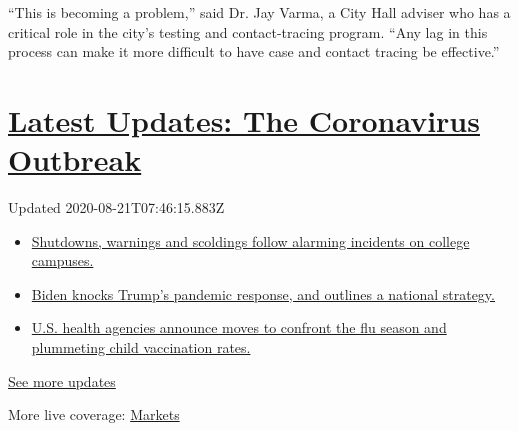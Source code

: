``This is becoming a problem,'' said Dr. Jay Varma, a City Hall adviser
who has a critical role in the city's testing and contact-tracing
program. ``Any lag in this process can make it more difficult to have
case and contact tracing be effective.''

\hypertarget{latest-updates-the-coronavirus-outbreak}{%
\section{\texorpdfstring{\href{https://www.nytimes3xbfgragh.onion/2020/08/20/world/coronavirus-covid.html?action=click\&pgtype=Article\&state=default\&region=MAIN_CONTENT_1\&context=storylines_live_updates}{Latest
Updates: The Coronavirus
Outbreak}}{Latest Updates: The Coronavirus Outbreak}}\label{latest-updates-the-coronavirus-outbreak}}

Updated 2020-08-21T07:46:15.883Z

\begin{itemize}
\tightlist
\item
  \href{https://www.nytimes3xbfgragh.onion/2020/08/20/world/coronavirus-covid.html?action=click\&pgtype=Article\&state=default\&region=MAIN_CONTENT_1\&context=storylines_live_updates\#link-68774d88}{Shutdowns,
  warnings and scoldings follow alarming incidents on college campuses.}
\item
  \href{https://www.nytimes3xbfgragh.onion/2020/08/20/world/coronavirus-covid.html?action=click\&pgtype=Article\&state=default\&region=MAIN_CONTENT_1\&context=storylines_live_updates\#link-26b58724}{Biden
  knocks Trump's pandemic response, and outlines a national strategy.}
\item
  \href{https://www.nytimes3xbfgragh.onion/2020/08/20/world/coronavirus-covid.html?action=click\&pgtype=Article\&state=default\&region=MAIN_CONTENT_1\&context=storylines_live_updates\#link-4e542da3}{U.S.
  health agencies announce moves to confront the flu season and
  plummeting child vaccination rates.}
\end{itemize}

\href{https://www.nytimes3xbfgragh.onion/2020/08/20/world/coronavirus-covid.html?action=click\&pgtype=Article\&state=default\&region=MAIN_CONTENT_1\&context=storylines_live_updates}{See
more updates}

More live coverage:
\href{https://www.nytimes3xbfgragh.onion/live/2020/08/20/business/stock-market-today-coronavirus?action=click\&pgtype=Article\&state=default\&region=MAIN_CONTENT_1\&context=storylines_live_updates}{Markets}

